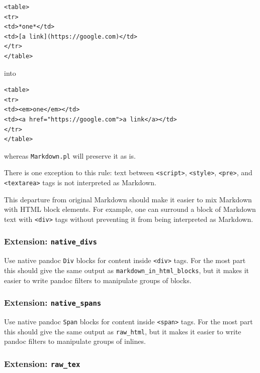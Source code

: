 \documentclass[
]{article}
\begin{document}
\begin{verbatim}
<table>
<tr>
<td>*one*</td>
<td>[a link](https://google.com)</td>
</tr>
</table>
\end{verbatim}

into

\begin{verbatim}
<table>
<tr>
<td><em>one</em></td>
<td><a href="https://google.com">a link</a></td>
</tr>
</table>
\end{verbatim}

whereas \texttt{Markdown.pl} will preserve it as is.

There is one exception to this rule: text between
\texttt{\textless{}script\textgreater{}},
\texttt{\textless{}style\textgreater{}},
\texttt{\textless{}pre\textgreater{}}, and
\texttt{\textless{}textarea\textgreater{}} tags is not interpreted as
Markdown.

This departure from original Markdown should make it easier to mix
Markdown with HTML block elements. For example, one can surround a block
of Markdown text with \texttt{\textless{}div\textgreater{}} tags without
preventing it from being interpreted as Markdown.

\hypertarget{extension-native_divs}{%
\subsubsection{\texorpdfstring{Extension:
\texttt{native\_divs}}{Extension: native\_divs}}\label{extension-native_divs}}

Use native pandoc \texttt{Div} blocks for content inside
\texttt{\textless{}div\textgreater{}} tags. For the most part this
should give the same output as \texttt{markdown\_in\_html\_blocks}, but
it makes it easier to write pandoc filters to manipulate groups of
blocks.

\hypertarget{extension-native_spans}{%
\subsubsection{\texorpdfstring{Extension:
\texttt{native\_spans}}{Extension: native\_spans}}\label{extension-native_spans}}

Use native pandoc \texttt{Span} blocks for content inside
\texttt{\textless{}span\textgreater{}} tags. For the most part this
should give the same output as \texttt{raw\_html}, but it makes it
easier to write pandoc filters to manipulate groups of inlines.

\hypertarget{extension-raw_tex}{%
\subsubsection{\texorpdfstring{Extension:
\texttt{raw\_tex}}{Extension: raw\_tex}}\label{extension-raw_tex}}
\end{document}
